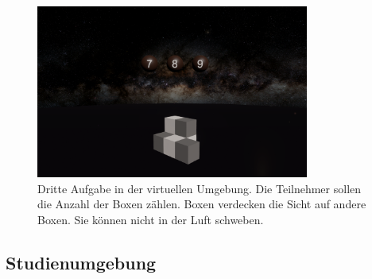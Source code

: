 \begin{figure}
	\centering
	\includegraphics[width=0.8\textwidth]{./images/counting.png}
	\caption{Dritte Aufgabe in der virtuellen Umgebung. Die Teilnehmer sollen die Anzahl der Boxen zählen. Boxen verdecken die Sicht auf andere Boxen. Sie können nicht in der Luft schweben.}
	\label{fig:counting}
\end{figure}

\subsection{Studienumgebung}

